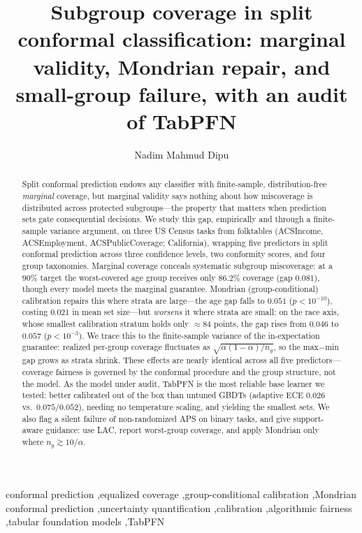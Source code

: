 \documentclass[review,12pt]{elsarticle}
\begin{document}
\begin{frontmatter}

\title{Subgroup coverage in split conformal classification: marginal validity, Mondrian repair, and small-group failure, with an audit of TabPFN}

\author[inst1]{Nadim Mahmud Dipu}

\begin{abstract}
Split conformal prediction endows any classifier with finite-sample, distribution-free \emph{marginal} coverage, but marginal validity says nothing about how miscoverage is distributed across protected subgroups---the property that matters when prediction sets gate consequential decisions. We study this gap, empirically and through a finite-sample variance argument, on three US Census tasks from folktables (ACSIncome, ACSEmployment, ACSPublicCoverage; California), wrapping five predictors in split conformal prediction across three confidence levels, two conformity scores, and four group taxonomies. Marginal coverage conceals systematic subgroup miscoverage: at a $90\%$ target the worst-covered age group receives only $86.2\%$ coverage (gap $0.081$), though every model meets the marginal guarantee. Mondrian (group-conditional) calibration repairs this where strata are large---the age gap falls to $0.051$ ($p<10^{-10}$), costing $0.021$ in mean set size---but \emph{worsens} it where strata are small: on the race axis, whose smallest calibration stratum holds only $\approx\!84$ points, the gap rises from $0.046$ to $0.057$ ($p<10^{-3}$). We trace this to the finite-sample variance of the in-expectation guarantee: realized per-group coverage fluctuates as $\sqrt{\alpha(1-\alpha)/n_g}$, so the max$-$min gap grows as strata shrink. These effects are nearly identical across all five predictors---coverage fairness is governed by the conformal procedure and the group structure, not the model. As the model under audit, TabPFN is the most reliable base learner we tested: better calibrated out of the box than untuned GBDTs (adaptive ECE $0.026$ vs.\ $0.075$/$0.052$), needing no temperature scaling, and yielding the smallest sets. We also flag a silent failure of non-randomized APS on binary tasks, and give support-aware guidance: use LAC, report worst-group coverage, and apply Mondrian only where $n_g \gtrsim 10/\alpha$.
\end{abstract}

\begin{keyword}
conformal prediction \sep equalized coverage \sep group-conditional calibration \sep Mondrian conformal prediction \sep uncertainty quantification \sep calibration \sep algorithmic fairness \sep tabular foundation models \sep TabPFN
\end{keyword}

\end{frontmatter}
\end{document}
